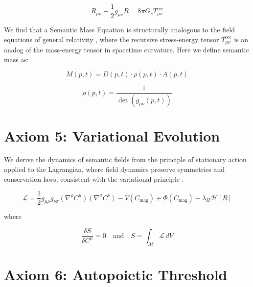 \begin{equation}
R_{\mu\nu} - \frac{1}{2}g_{\mu\nu}R = 8\pi G_s T^{\text{rec}}_{\mu\nu}
\end{equation}

We find that a Semantic Mass Equation is structurally analogous to the field equations of general relativity \autocite{Einstein1915, MisnerThorneWheeler1973, Wald1984}, where the recursive stress-energy tensor \(T^{\text{rec}}_{\mu\nu}\) is an analog of the mass-energy tensor in spacetime curvature. Here we define semantic mass as:

\begin{equation}
M(p,t) = D(p,t) \cdot \rho(p,t) \cdot A(p,t)
\end{equation}

\begin{equation}
\rho(p,t) = \frac{1}{\det(g_{\mu\nu}(p,t))}
\end{equation}


\section{Axiom 5: Variational Evolution}
\label{1.5:axiom_5_variational_evolution}

We derive the dynamics of semantic fields from the principle of stationary action applied to the Lagrangian, where field dynamics preserve symmetries and conservation laws, consistent with the variational principle \autocite{GoldsteinPooleSafko2002, Arnold1989}.

\begin{equation}
\mathcal{L} = \frac{1}{2} g_{\mu\rho} g_{\nu\sigma} (\nabla^\rho C^\mu)(\nabla^\sigma C^\nu) - V(C_{\text{mag}}) + \Phi(C_{\text{mag}}) - \lambda_H \mathcal{H}[R]
\end{equation}

where

\begin{equation}
\frac{\delta S}{\delta C^\mu} = 0 \quad \text{and} \quad S = \int_{\mathcal{M}} \mathcal{L} \, dV
\end{equation}


\section{Axiom 6: Autopoietic Threshold}
\label{1.6:axiom_6_autopoietic_threshold}

